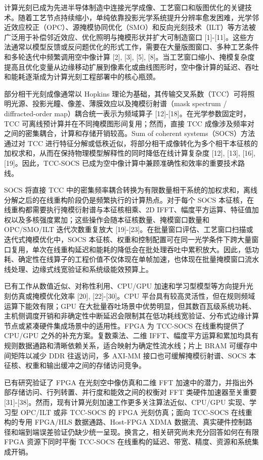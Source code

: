 \documentclass[
  preprint]{elsarticle}
\begin{document}
计算光刻已成为先进半导体制造中连接光学成像、工艺窗口和版图优化的关键技术。随着工艺节点持续缩小，单纯依靠投影光学系统提升分辨率愈发困难，光学邻近效应校正（OPC）、源掩模协同优化（SMO）和反向光刻技术（ILT）等方法被广泛用于补偿邻近效应、优化照明与掩模形状并扩大可制造窗口
{[}1{]}-{[}11{]}。这些方法通常以模型反馈或反问题优化的形式工作，需要在大量版图窗口、多种工艺条件和多轮迭代中频繁调用空中像计算
{[}2{]}, {[}3{]}, {[}5{]},
{[}8{]}。当工艺窗口缩小、掩模复杂度提高且优化变量从边缘移动扩展到像素化或曲线图形时，空中像计算的延迟、吞吐和能耗逐渐成为计算光刻工程部署中的核心瓶颈。

部分相干光刻成像通常以 Hopkins
理论为基础，其传输交叉系数（TCC）可将照明光源、投影光瞳、像差、薄膜效应以及掩模衍射谱（mask
spectrum / diffracted-order map）耦合统一表示为频域算子
{[}12{]}-{[}18{]}。在光学参数固定时，TCC
可离线预计算并在不同掩模图形间复用；然而，直接 TCC
成像涉及频率对之间的密集耦合，计算和存储开销较高。Sum of coherent
systems（SOCS）方法通过对 TCC
进行特征分解或低秩近似，将部分相干成像转化为多个相干本征核的加权求和，从而在保持物理模型解释性的同时降低在线计算复杂度
{[}12{]}, {[}13{]}, {[}16{]}, {[}19{]}。因此，TCC-SOCS
已成为空中像计算中兼顾准确性和效率的重要技术路线。

SOCS 将直接 TCC
中的密集频率耦合转换为有限数量相干系统的加权求和，离线分解之后的在线重构阶段仍是频繁执行的计算热点。对于每个
SOCS 本征核，在线重构都需要执行掩模衍射谱与本征核相乘、2D
IFFT、幅度平方运算、特征值加权以及多核强度累加；这些操作会随本征核数量、掩模窗口数量和
OPC/SMO/ILT 迭代次数重复放大
{[}19{]}-{[}23{]}。在批量窗口评估、工艺窗口扫描或迭代式掩模优化中，SOCS
本征核、权重和控制配置可在同一光学条件下跨大量窗口复用，单次在线重构延迟和能耗的降低会在批处理吞吐中累积放大。因此，低功耗、确定性在线算子的工程价值不仅体现在单帧加速，也体现在批量掩模窗口流水线处理、边缘式线宽验证和系统级能效预算上。

已有工作从数值近似、对称性利用、CPU/GPU
加速和学习型模型等方向提升光刻仿真或掩模优化效率 {[}20{]},
{[}22{]}-{[}30{]}。CPU
平台具有较高灵活性，但在规则频域运算下能效有限；GPU
在大批量吞吐场景中优势明显，但其数百瓦级系统功耗、主机侧调度开销和非确定性中断延迟会限制其在低功耗线宽验证、分布式边缘计算节点或紧凑硬件集成场景中的适用性。FPGA
为 TCC-SOCS 在线重构提供了 CPU/GPU 之外的补充方案。复数乘法、二维
IFFT、幅度平方运算和累加均具有规则数据通路和清晰依赖关系，适合映射为确定性流水线；片上
BRAM 可缓存中间矩阵以减少 DDR 往返访问，多 AXI-MM
接口也可缓解掩模衍射谱、SOCS 本征核、权重和输出缓冲之间的存储访问竞争。

已有研究验证了 FPGA 在光刻空中像仿真和二维 FFT
加速中的潜力，并指出外部存储访问、行列转置、并行度和能效之间的权衡对 FFT
类硬件加速器至关重要
{[}31{]}-{[}38{]}。然而，现有计算光刻加速工作更多关注算法近似、CPU/GPU
实现、学习型 OPC/ILT 或非 TCC-SOCS 的 FPGA 光刻仿真；面向 TCC-SOCS
在线重构的专用 FPGA/HLS 数据通路、Host-FPGA XDMA
数据流、真实硬件控制路径和端到端误差验证仍缺少统一呈现。换言之，相关研究尚未充分回答如何在有限
FPGA 资源下同时平衡 TCC-SOCS
在线重构的延迟、带宽、精度、资源和系统集成开销。
\end{document}
